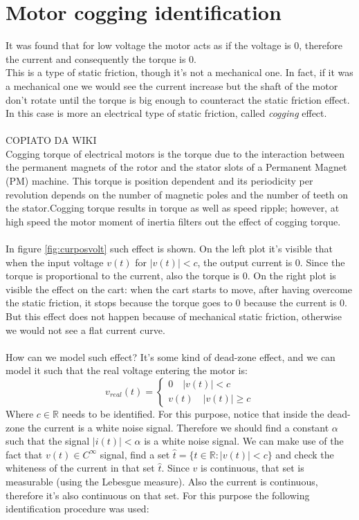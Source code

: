 \section{Motor cogging identification}
It was found that for low voltage the motor acts as if the voltage is $0$, therefore the current and consequently the torque is $0$.\\
This is  a type of static friction, though it's not a mechanical one. In fact, if it was a mechanical one we would see the current increase but the shaft of the motor don't rotate until the torque is big enough to counteract the static friction effect. In this case is more an electrical type of static friction, called \emph{cogging} effect. \\ \\
COPIATO DA WIKI \\
Cogging torque of electrical motors is the torque due to the interaction between the permanent magnets of the rotor and the stator slots of a Permanent Magnet (PM) machine. This torque is position dependent and its periodicity per revolution depends on the number of magnetic poles and the number of teeth on the stator.Cogging torque results in torque as well as speed ripple; however, at high speed the motor moment of inertia filters out the effect of cogging torque.
\\ \\
In figure \ref{fig:curposvolt} such effect is shown. On the left plot it's visible that when the input voltage $v(t)$ for $|v(t)|< c$, the output current is $0$. Since the torque is proportional to the current, also the torque is $0$. On the right plot is visible the effect on the cart: when the cart starts to move, after having overcome the static friction, it stops because the torque goes to $0$ because the current is $0$. But this effect does not happen because of mechanical static friction, otherwise we would not see a flat current curve.  \\ \\
How can we model such effect? It's some kind of dead-zone effect, and we can model it such that the real voltage entering the motor is:
\begin{equation}
v_{real}(t) = \begin{cases}
0 \quad |v(t)| < c \\
v(t) \quad |v(t)| \geq c
\end{cases}
\end{equation}
Where $c \in \mathbb{R}$ needs to be identified. For this purpose, notice that inside the dead-zone the current is a white noise signal. Therefore we should find a constant $\alpha$ such that the signal $|i(t)| < \alpha$ is a white noise signal. We can make use of the fact that $v(t) \in C^{\infty}$ signal, find a set $\hat{t} = \{ t \in \mathbb{R}: |v(t)| < c \}$ and check the whiteness of the current in that set $\hat{t}$. Since $v$ is continuous, that set is measurable (using the Lebesgue measure). Also the current is continuous, therefore it's also continuous on that set. For this purpose the following identification procedure was used:
